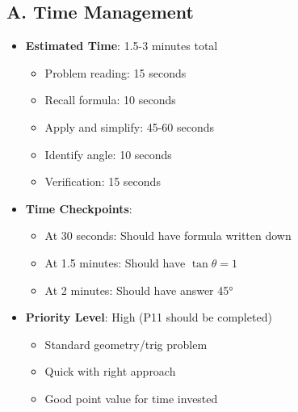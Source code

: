 \documentclass[12pt]{article}
\begin{document}
\begin{competitionbox}
\subsection*{A. Time Management}
\begin{itemize}[leftmargin=*]
    \item \textbf{Estimated Time}: 1.5-3 minutes total
    \begin{itemize}
        \item Problem reading: 15 seconds
        \item Recall formula: 10 seconds
        \item Apply and simplify: 45-60 seconds
        \item Identify angle: 10 seconds
        \item Verification: 15 seconds
    \end{itemize}
    \item \textbf{Time Checkpoints}: 
    \begin{itemize}
        \item At 30 seconds: Should have formula written down
        \item At 1.5 minutes: Should have $\tan\theta = 1$
        \item At 2 minutes: Should have answer 45°
    \end{itemize}
    \item \textbf{Priority Level}: High (P11 should be completed)
    \begin{itemize}
        \item Standard geometry/trig problem
        \item Quick with right approach
        \item Good point value for time invested
    \end{itemize}
\end{itemize}


\end{competitionbox}
\end{document}
